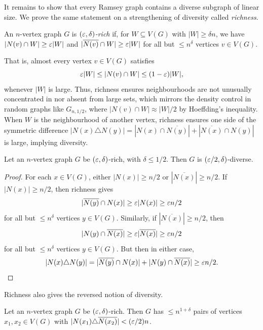 It remains to show that every Ramsey graph contains a diverse subgraph of linear size. We prove the same statement on a strengthening of diversity called \textit{richness}.

\begin{definition}
  \label{def:richness}
  An $n$-vertex graph $G$ is \textit{$(\varepsilon, \delta)$-rich} if, for $W \subseteq V(G)$ with $|W| \geq \delta n$, we have $|N(v) \cap W| \geq \varepsilon|W|$ and $|\overline{N(v)} \cap W| \geq \varepsilon|W|$ for all but $\leq n^{\delta}$ vertices $v \in V(G)$.
\end{definition}

That is, almost every vertex $v \in V(G)$ satisfies 
\[
  \varepsilon |W| \leq |N(v) \cap W| \leq (1 - \varepsilon) |W|,
\]
whenever $|W|$ is large. Thus, richness ensures neighbourhoods are not unusually concentrated in nor absent from large sets, which mirrors the density control in random graphs like $G_{n, 1/2}$, where $|N(v) \cap W| \approx |W|/2$ by Hoeffding's inequality. When $W$ is the neighbourhood of another vertex, richness ensures one side of the symmetric difference $|N(x) \triangle N(y)| = |N(x) \cap \overline{N(y)}| + |\overline{N(x)} \cap N(y)|$ is large, implying diversity.

\begin{lemma}
  \label{lem:richness-implies-diversity}
  Let an $n$-vertex graph $G$ be $(\varepsilon, \delta)$-rich, with $\delta \leq 1/2$. Then $G$ is $(\varepsilon/2, \delta)$-diverse.
\end{lemma}

\begin{proof}
  For each $x \in V(G)$, either $|N(x)| \geq n/2$ or $|\overline{N(x)}| \geq n/2$. If $|N(x)| \geq n/2$, then richness gives
  \[
    |\overline{N(y)} \cap N(x)| \geq \varepsilon |N(x)| \geq \varepsilon n/2
  \]
  for all but $\leq n^{\delta}$ vertices $y \in V(G)$. Similarly, if $|\overline{N(x)}| \geq n/2$, then
  \[
    |N(y) \cap \overline{N(x)}| \geq \varepsilon |\overline{N(x)}| \geq \varepsilon n/2
  \]
  for all but $\leq n^{\delta}$ vertices $y \in V(G)$. But then in either case,
  \[
    |N(x) \triangle N(y)| = |\overline{N(y)} \cap N(x)|  + |N(y) \cap \overline{N(x)}| \geq \varepsilon n/2.
  \]
\end{proof}

Richness also gives the reversed notion of diversity.

\begin{lemma}
  \label{lem:richness-implies-upper-bound}
  Let an $n$-vertex graph $G$ be $(\varepsilon, \delta)$-rich. Then $G$ has $\leq n^{1 + \delta}$ pairs of vertices $x_1, x_2 \in V(G)$ with $|N(x_1) \triangle \overline{N(x_2)}| < (\varepsilon/2)n$.
\end{lemma}

